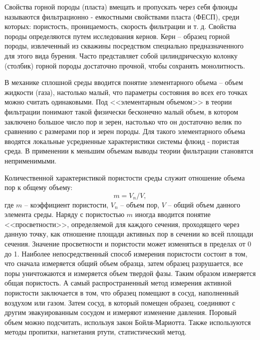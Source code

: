 Свойства горной породы (пласта) вмещать и пропускать через себя флюиды называются фильтрационно - емкостными свойствами пласта (ФЕСП), среди которых: пористость, проницаемость, скорость фильтрации и т. д.
Свойства породы определяются путем исследования кернов. Керн -- образец горной породы, извлеченный из скважины посредством специально предназначенного для этого вида бурения.
Часто представляет собой цилиндрическую колонку (столбик) горной породы достаточно прочной, чтобы сохранять монолитность.

В механике сплошной среды вводится понятие элементарного объема -- объем жидкости (газа), настолько малый, что параметры состояния во всех его точках можно считать одинаковыми.
Под <<элементарным объемом>> в теории фильтрации понимают такой физически бесконечно малый объем, в котором заключено большое число пор и зерен, настолько что он достаточно велик по сравнению с размерами пор и зерен породы. 
Для такого элементарного объема вводятся локальные усредненные характеристики системы флюид - пористая среда. В применении к меньшим объемам выводы теории фильтрации становятся неприменимыми.

Количественной характеристикой пористости среды служит отношение объема пор к общему объему: 
\begin{equation}
m=V_n/V, 
\end{equation}
 где $m$ -- коэффициент пористости, $V_n$ -- объем пор, $V$ -- общий объем данного элемента среды.
Наряду с пористостью $m$ иногда вводится понятие <<просветности>>, определяемой для каждого сечения, проходящего через данную точку, как отношение площади активных пор в сечении ко всей площади сечения.
Значение просветности и пористости может изменяться в пределах от 0 до 1.
Наиболее непосредственный способ измерения пористости состоит в том, что сначала измеряется общий объем образца, затем образец разрушается, все поры уничтожаются и измеряется объем твердой фазы. Таким образом
измеряется общая пористость. А самый распространенный метод измерения активной пористости заключается в том, что образец помещают в сосуд, наполненный воздухом или газом. Затем сосуд, в который помещен образец, соединяют с другим эвакуированным
сосудом и измеряют изменение давления. Поровый объем можно подсчитать, используя закон Бойля-Мариотта. Также используются методы пропитки, нагнетания ртути, статистический метод.

